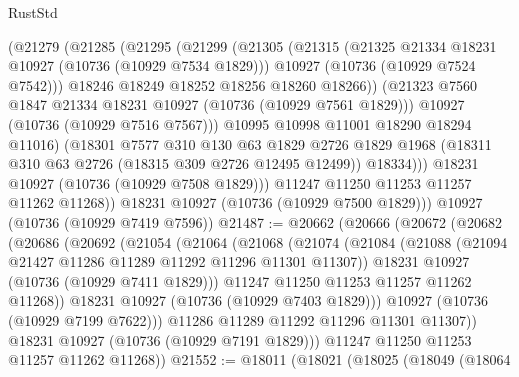 \begin{lexlean}{RustStd}
\begin{coremodule}
              (@21279
                (@21285
                  (@21295
                    (@21299
                      (@21305
                        (@21315
                          (@21325 @21334 @18231 @10927 (@10736 (@10929 @7534 @1829)))
                          @10927
                          (@10736 (@10929 @7524 @7542)))
                        @18246
                        @18249
                        @18252
                        @18256
                        @18260
                        @18266))
                    (@21323 @7560 @1847 @21334 @18231 @10927 (@10736 (@10929 @7561 @1829)))
                    @10927
                    (@10736 (@10929 @7516 @7567)))
                  @10995
                  @10998
                  @11001
                  @18290
                  @18294
                  @11016)
                (@18301
                  @7577
                  @310
                  @130
                  @63
                  @1829
                  @2726
                  @1829
                  @1968
                  (@18311 @310 @63 @2726 (@18315 @309 @2726 @12495 @12499))
                  @18334)))
            @18231
            @10927
            (@10736 (@10929 @7508 @1829)))
          @11247
          @11250
          @11253
          @11257
          @11262
          @11268))
      @18231
      @10927
      (@10736 (@10929 @7500 @1829)))
    @10927
    (@10736 (@10929 @7419 @7596))
@21487 := @20662
    (@20666
      (@20672
        (@20682
          (@20686
            (@20692
              (@21054
                (@21064
                  (@21068
                    (@21074
                      (@21084
                        (@21088 (@21094 @21427 @11286 @11289 @11292 @11296 @11301 @11307))
                        @18231
                        @10927
                        (@10736 (@10929 @7411 @1829)))
                      @11247
                      @11250
                      @11253
                      @11257
                      @11262
                      @11268))
                  @18231
                  @10927
                  (@10736 (@10929 @7403 @1829)))
                @10927
                (@10736 (@10929 @7199 @7622)))
              @11286
              @11289
              @11292
              @11296
              @11301
              @11307))
          @18231
          @10927
          (@10736 (@10929 @7191 @1829)))
        @11247
        @11250
        @11253
        @11257
        @11262
        @11268))
@21552 := @18011
    (@18021
      (@18025
        (@18049
          (@18064

\end{coremodule}
\end{lexlean}
